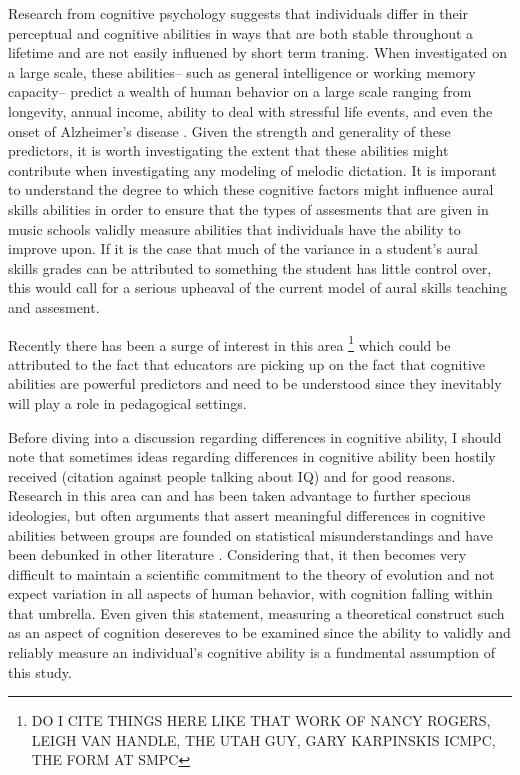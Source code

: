 \documentclass[]{book}
\let\rmarkdownfootnote\footnote%
\def\footnote{\protect\rmarkdownfootnote}
\theoremstyle{definition}
\theoremstyle{definition}
\theoremstyle{definition}
\theoremstyle{remark}
\begin{document}
Research from cognitive psychology suggests that individuals differ in
their perceptual and cognitive abilities in ways that are both stable
throughout a lifetime and are not easily influened by short term
traning. When investigated on a large scale, these abilities-- such as
general intelligence or working memory capacity-- predict a wealth of
human behavior on a large scale ranging from longevity, annual income,
ability to deal with stressful life events, and even the onset of
Alzheimer's disease
\citep{ritchieIntelligenceAllThat2015, unsworthAutomatedVersionOperation2005}.
Given the strength and generality of these predictors, it is worth
investigating the extent that these abilities might contribute when
investigating any modeling of melodic dictation. It is imporant to
understand the degree to which these cognitive factors might influence
aural skills abilities in order to ensure that the types of assesments
that are given in music schools validly measure abilities that
individuals have the ability to improve upon. If it is the case that
much of the variance in a student's aural skills grades can be
attributed to something the student has little control over, this would
call for a serious upheaval of the current model of aural skills
teaching and assesment.

Recently there has been a surge of interest in this area \footnote{DO I
  CITE THINGS HERE LIKE THAT WORK OF NANCY ROGERS, LEIGH VAN HANDLE, THE
  UTAH GUY, GARY KARPINSKIS ICMPC, THE FORM AT SMPC} which could be
attributed to the fact that educators are picking up on the fact that
cognitive abilities are powerful predictors and need to be understood
since they inevitably will play a role in pedagogical settings.

Before diving into a discussion regarding differences in cognitive
ability, I should note that sometimes ideas regarding differences in
cognitive ability been hostily received (citation against people talking
about IQ) and for good reasons. Research in this area can and has been
taken advantage to further specious ideologies, but often arguments that
assert meaningful differences in cognitive abilities between groups are
founded on statistical misunderstandings and have been debunked in other
literature \citep{gouldMismeasureMan1996}. Considering that, it then
becomes very difficult to maintain a scientific commitment to the theory
of evolution \citep{darwinOriginSpecies1859} and not expect variation in
all aspects of human behavior, with cognition falling within that
umbrella. Even given this statement, measuring a theoretical construct
such as an aspect of cognition desereves to be examined since the
ability to validly and reliably measure an individual's cognitive
ability is a fundmental assumption of this study.
\end{document}
